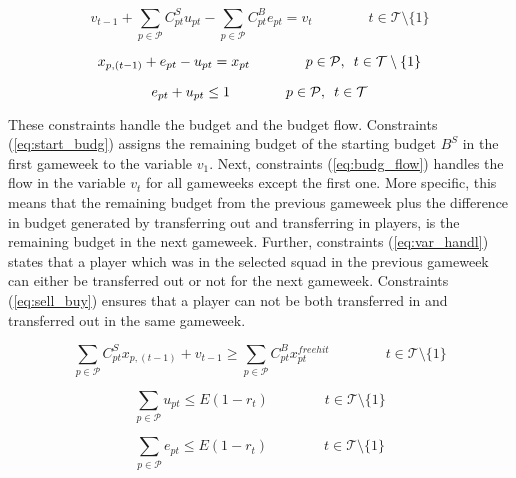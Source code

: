 \begin{equation} \label{eq:budg_flow}
    v_{t-1} + \sum_{p \in \mathcal{P}}C_{pt}^{S}u_{pt} - \sum_{p \in \mathcal{P}}C_{pt}^{B}e_{pt} = v_{t} \qquad\qquad t \in \mathcal{T}\setminus\{1\}
\end{equation}

\begin{equation} \label{eq:var_handl}
  x_{p,(t-1)} + e_{pt} - u_{pt} = x_{pt} \qquad\qquad p \in \mathcal{P}, \enskip t \in \mathcal{T}\setminus\{1\} 
\end{equation}

\begin{equation} \label{eq:sell_buy}
   e_{pt} + u_{pt} \leq 1  \qquad\qquad p \in \mathcal{P}, \enskip t \in \mathcal{T} 
\end{equation}

These constraints handle the budget and the budget flow. Constraints (\ref{eq:start_budg}) assigns the remaining budget of the starting budget $B^{S}$ in the first gameweek to the variable $v_{1}$. Next, constraints (\ref{eq:budg_flow}) handles the  flow in the variable $v_{t}$ for all gameweeks except the first one. More specific, this means that the remaining budget from the previous gameweek plus the difference in budget generated by transferring out and transferring in players, is the remaining budget in the next gameweek. Further, constraints (\ref{eq:var_handl}) states that a player which was in the selected squad in the previous gameweek can either be transferred out or not for the next gameweek. Constraints (\ref{eq:sell_buy}) ensures that a player can not be both transferred in and transferred out in the same gameweek.


\begin{equation} \label{eq:free_hit_budget}
  \sum_{p \in \mathcal{P}}C_{pt}^{S}x_{p,(t-1)} + v_{t-1} \geq \sum_{p \in \mathcal{P}}C_{pt}^{B} x_{pt}^{free hit} \qquad\qquad t \in \mathcal{T}\setminus\{1\}
\end{equation}

\begin{equation} \label{eq:free_hit_sell}
  \sum_{p \in \mathcal{P}}u_{pt} \leq E (1-r_{t}) \qquad\qquad t \in \mathcal{T}\setminus\{1\}
\end{equation}

\begin{equation} \label{eq:free_hit_buy}
  \sum_{p \in \mathcal{P}}e_{pt} \leq E (1-r_{t}) \qquad\qquad t \in \mathcal{T}\setminus\{1\}
\end{equation}


